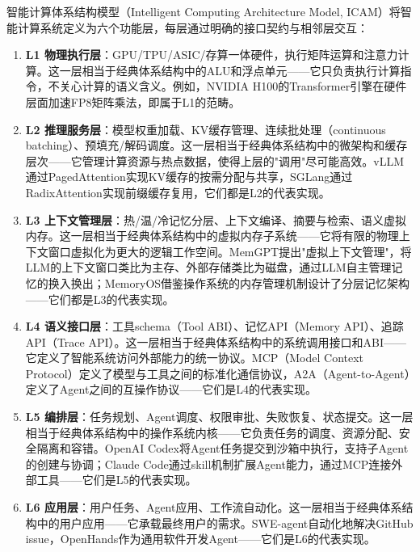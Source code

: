 \begin{definition}
智能计算体系结构模型（Intelligent Computing Architecture Model, ICAM）将智能计算系统定义为六个功能层，每层通过明确的接口契约与相邻层交互：
\begin{enumerate}[nosep]
\item \textbf{L1 物理执行层}：GPU/TPU/ASIC/存算一体硬件，执行矩阵运算和注意力计算。这一层相当于经典体系结构中的ALU和浮点单元——它只负责执行计算指令，不关心计算的语义含义。例如，NVIDIA H100的Transformer引擎在硬件层面加速FP8矩阵乘法，即属于L1的范畴。

\item \textbf{L2 推理服务层}：模型权重加载、KV缓存管理、连续批处理（continuous batching）、预填充/解码调度。这一层相当于经典体系结构中的微架构和缓存层次——它管理计算资源与热点数据，使得上层的"调用"尽可能高效。vLLM通过PagedAttention实现KV缓存的按需分配与共享\cite{kwon2023pagedattention}，SGLang通过RadixAttention实现前缀缓存复用\cite{sglang2024}，它们都是L2的代表实现。

\item \textbf{L3 上下文管理层}：热/温/冷记忆分层、上下文编译、摘要与检索、语义虚拟内存。这一层相当于经典体系结构中的虚拟内存子系统——它将有限的物理上下文窗口虚拟化为更大的逻辑工作空间。MemGPT提出"虚拟上下文管理"，将LLM的上下文窗口类比为主存、外部存储类比为磁盘，通过LLM自主管理记忆的换入换出\cite{memgpt2023}；MemoryOS借鉴操作系统的内存管理机制设计了分层记忆架构\cite{memoryos2025}——它们都是L3的代表实现。

\item \textbf{L4 语义接口层}：工具schema（Tool ABI）、记忆API（Memory API）、追踪API（Trace API）。这一层相当于经典体系结构中的系统调用接口和ABI——它定义了智能系统访问外部能力的统一协议。MCP（Model Context Protocol）定义了模型与工具之间的标准化通信协议\cite{mcp_intro_2026}，A2A（Agent-to-Agent）定义了Agent之间的互操作协议\cite{agentprotocols2025}——它们是L4的代表实现。

\item \textbf{L5 编排层}：任务规划、Agent调度、权限审批、失败恢复、状态提交。这一层相当于经典体系结构中的操作系统内核——它负责任务的调度、资源分配、安全隔离和容错。OpenAI Codex将Agent任务提交到沙箱中执行，支持子Agent的创建与协调\cite{openai_codex_overview_2026,openai_codex_subagents_2026}；Claude Code通过skill机制扩展Agent能力，通过MCP连接外部工具\cite{anthropic_claudecode_overview_2026,anthropic_claudecode_skills_2026}——它们是L5的代表实现。

\item \textbf{L6 应用层}：用户任务、Agent应用、工作流自动化。这一层相当于经典体系结构中的用户应用——它承载最终用户的需求。SWE-agent自动化地解决GitHub issue\cite{sweagent2024}，OpenHands作为通用软件开发Agent\cite{openhands_paper_2025}——它们是L6的代表实现。
\end{enumerate}
\end{definition}

